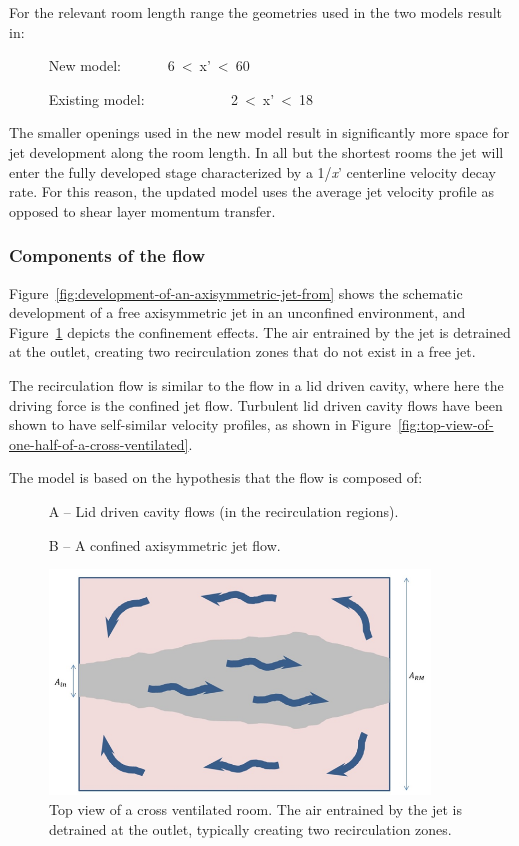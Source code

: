 For the relevant room length range the geometries used in the two models result in:

~~~~~ New model:~~~~~~ 6~\textless{}~x'~\textless{}~60

~~~~~ Existing model: ~~~~~~~~~~~ 2~\textless{}~x'~\textless{}~18

The smaller openings used in the new model result in significantly more space for jet development along the room length. In all but the shortest rooms the jet will enter the fully developed stage characterized by a 1/\emph{x}' centerline velocity decay rate. For this reason, the updated model uses the average jet velocity profile as opposed to shear layer momentum transfer.

\subsubsection{Components of the flow}\label{components-of-the-flow}

Figure~\ref{fig:development-of-an-axisymmetric-jet-from} shows the schematic development of a free axisymmetric jet in an unconfined environment, and Figure~\ref{fig:top-view-of-a-cross-ventilated-room.-the-air} depicts the confinement effects. The air entrained by the jet is detrained at the outlet, creating two recirculation zones that do not exist in a free jet.

The recirculation flow is similar to the flow in a lid driven cavity, where here the driving force is the confined jet flow. Turbulent lid driven cavity flows have been shown to have self-similar velocity profiles, as shown in Figure~\ref{fig:top-view-of-one-half-of-a-cross-ventilated}.

The model is based on the hypothesis that the flow is composed of:

~~~~~ A -- Lid driven cavity flows (in the recirculation regions).

~~~~~ B -- A confined axisymmetric jet flow.

\begin{figure}[hbtp] %
\centering
\includegraphics[width=0.9\textwidth, height=0.9\textheight, keepaspectratio=true]{media/image2623.png}
\caption{Top view of a cross ventilated room. The air entrained by the jet is detrained at the outlet, typically creating two recirculation zones. \protect \label{fig:top-view-of-a-cross-ventilated-room.-the-air}}
\end{figure}


